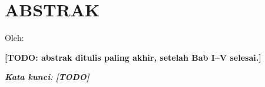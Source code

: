 \clearpage
\chapter*{ABSTRAK}
\begin{center}
  \center
  \begin{singlespace}
    \large\bfseries\MakeUppercase{\thetitle}

    \normalfont\normalsize
    Oleh:

    \bfseries \theauthor
  \end{singlespace}
\end{center}

\begin{singlespace}
  \small
  \textbf{[TODO: abstrak ditulis paling akhir, setelah Bab I--V selesai.]}

  \textit{\textbf{Kata kunci}: \textbf{[TODO]}}

\end{singlespace}
\clearpage

